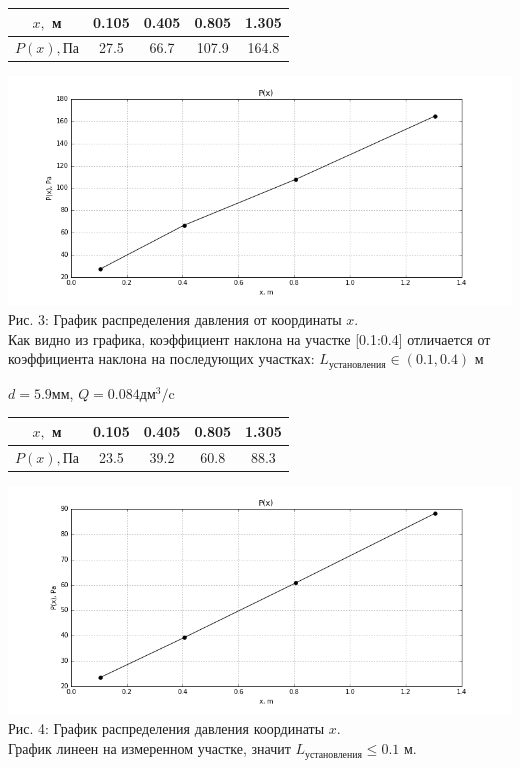 \documentclass[10pt]{article}
\begin{document}
\begin{enumerate}
\begin{center}
                    \begin{tabular}{|c|c|c|c|c|}
                            \hline
                                $x ,$ м  &0.105&0.405&0.805&1.305\\
                            \hline
                                $P(x) , \text{Па}$ &27.5&66.7&107.9&164.8\\
                            \hline
                        \end{tabular}
                        \includegraphics[width=15cm]{g11mm.png}
                    \\ Рис. 3: График распределения давления от координаты $x$.\\
                    
                    Как видно из графика, коэффициент наклона на участке [0.1:0.4] отличается от коэффициента наклона на последующих участках: $L_\text{установления} \in (0.1,0.4)$ м 


                    $d = 5.9$мм, $Q = 0.084 \text{дм}^3/\text{c}$

                    \begin{tabular}{|c|c|c|c|c|}
                            \hline
                                $x ,$ м  &0.105&0.405&0.805&1.305\\
                            \hline
                                $P(x) , \text{Па}$ &23.5&39.2&60.8&88.3\\
                            \hline
                        \end{tabular}
                        \includegraphics[width=15cm]{g22mm.png}
                    \\ Рис. 4: График распределения давления координаты $x$. 
                    \\График линеен на измеренном участке, значит $L_\text{установления} \leq 0.1$ м.                    
                    \end{center}


\end{enumerate}
\end{document}
